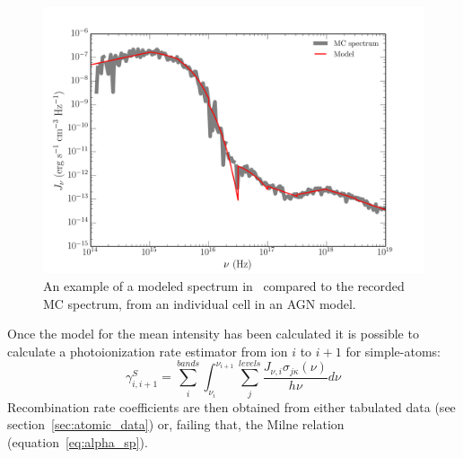 \begin{figure}
\centering
\includegraphics[width=1.0\textwidth]{figures/03-radtrans/cell_spec.png}
\caption
{
An example of a modeled spectrum in \py\ compared to the recorded MC spectrum,
from an individual cell in an AGN model.
} 
\label{fig:cell_spec}
\end{figure}

Once the model for the mean intensity has been calculated it is possible
to calculate a photoionization rate estimator from ion $i$ to $i+1$ 
for simple-atoms:
\begin{equation}
\gamma_{i,i+1}^S = \sum_i^{bands} \int_{\nu_i}^{\nu_{i+1}} 
\sum_j^{levels} \frac{J_{\nu,i} \sigma_{j\kappa}(\nu) }{h \nu} d\nu
\end{equation}
Recombination rate coefficients are then obtained from 
either tabulated data (see section~\ref{sec:atomic_data})
or, failing that, the Milne relation (equation~\ref{eq:alpha_sp}).

